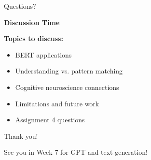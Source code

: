 \documentclass[aspectratio=169]{beamer}
\begin{document}
\begin{frame}{Questions? 🙋}
\begin{center}
\LARGE
\textbf{Discussion Time}
\end{center}

\vspace{1em}

\textbf{Topics to discuss:}
\begin{itemize}\setlength{\itemsep}{0pt}
    \item BERT applications
    \item Understanding vs. pattern matching
    \item Cognitive neuroscience connections
    \item Limitations and future work
    \item Assignment 4 questions
\end{itemize}

\vspace{1em}

\begin{center}
\Large
Thank you! 🙏

\vspace{1em}

See you in Week 7 for GPT and text generation!
\end{center}
\end{frame}
\end{document}
